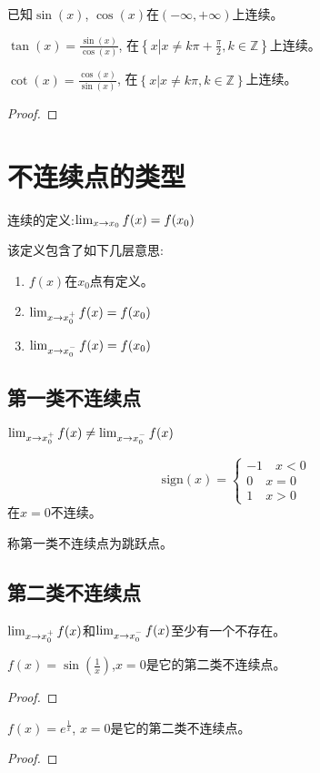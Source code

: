 \documentclass[lang=cn]{elegantbook}
\begin{document}
\begin{proposition}
    已知$\sin(x)$, $\cos(x)$在$(-\infty, +\infty)$上连续。

    $\tan(x) = \frac{\sin(x)}{\cos(x)}$, 在$\left\{ x\left| x \neq k\pi + \frac{\pi}{2}, k \in \mathbb{Z}\right.\right\}$上连续。

    $\cot(x) = \frac{\cos(x)}{\sin(x)}$, 在$\left\{ x\left| x \neq k\pi, k \in \mathbb{Z}\right.\right\}$上连续。
\end{proposition}
\begin{proof}
    
\end{proof}

\section{不连续点的类型}
连续的定义:$\lim_{x \to x_0 } f(x) = f(x_0)$

该定义包含了如下几层意思:
\begin{enumerate}
    \item $f(x)$在$x_0$点有定义。
    \item $\lim_{x \to x_0^+ } f(x) = f(x_0)$ 
    \item $\lim_{x \to x_0^- } f(x) = f(x_0)$
\end{enumerate}
\subsection{第一类不连续点}
$\lim_{x \to x_0^+ } f(x) \neq \lim_{x \to x_0^- } f(x)$
\begin{proposition}
    \begin{equation*}
        \mathrm{sign} (x) = \left\{ 
            \begin{aligned}
                -1 \quad x < 0 \\
                0 \quad x = 0 \\
                1 \quad x > 0 
            \end{aligned}
        \right.
    \end{equation*}
    在$x=0$不连续。
\end{proposition}
称第一类不连续点为跳跃点。
\subsection{第二类不连续点}
$\lim_{x \to x_0^+ } f(x)$和$\lim_{x \to x_0^- } f(x)$至少有一个不存在。
\begin{proposition}
    $f(x) = \sin(\frac{1}{x})$,$x=0$是它的第二类不连续点。
\end{proposition}
\begin{proof}
    
\end{proof}
\begin{proposition}
    $f(x) = e^{\frac{1}{x}}$, $x = 0$是它的第二类不连续点。
\end{proposition}
\begin{proof}
    
\end{proof}
\end{document}
